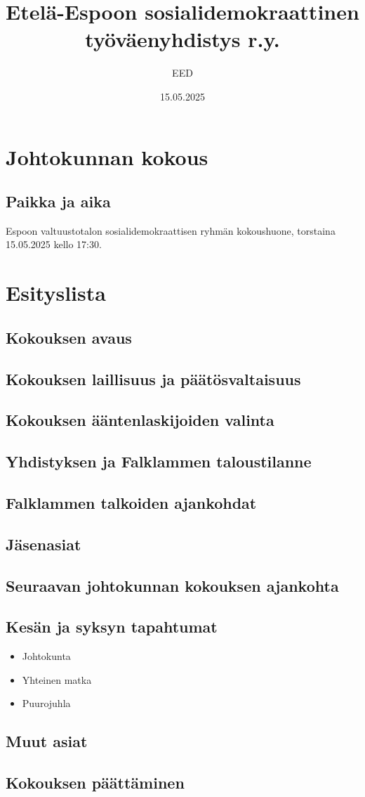\documentclass[a4paper,12pt]{article}
\title{Etelä-Espoon sosialidemokraattinen työväenyhdistys r.y.}
\author{EED}
\date{15.05.2025}
\begin{document}
\maketitle
\tableofcontents
\section*{Johtokunnan kokous}
\subsection*{Paikka ja aika}
Espoon valtuustotalon sosialidemokraattisen ryhmän kokoushuone, torstaina 15.05.2025 kello 17:30.
\section*{Esityslista}
\subsection{Kokouksen avaus}
\subsection{Kokouksen laillisuus ja päätösvaltaisuus}
\subsection{Kokouksen ääntenlaskijoiden valinta}
\subsection{Yhdistyksen ja Falklammen taloustilanne}
\subsection{Falklammen talkoiden ajankohdat}
\subsection{Jäsenasiat}
\subsection{Seuraavan johtokunnan kokouksen ajankohta}
\subsection{Kesän ja syksyn tapahtumat}
\begin{itemize}
\item{Johtokunta}
\item{Yhteinen matka}
\item{Puurojuhla}
\end{itemize}
\subsection{Muut asiat}
\subsection{Kokouksen päättäminen}
\end{document}
